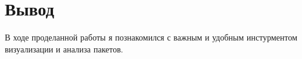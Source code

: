 \chapter{Вывод}
\label{ch:chap3}

В ходе проделанной работы я познакомился с важным и удобным инстурментом визуализации и анализа пакетов.

\endinput
